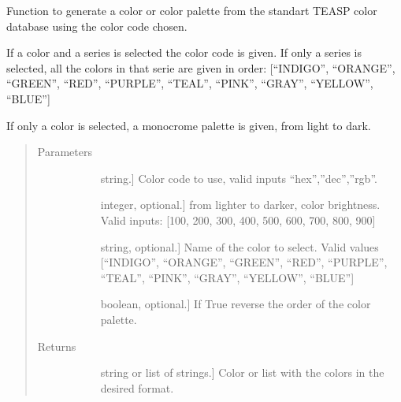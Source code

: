 \documentclass[letterpaper,10pt,english]{sphinxmanual}
\begin{document}
\begin{fulllineitems}
\label{\detokenize{rstFiles/standartColorPalette:standartColorPalette.stdColor}}
Function to generate a color or color palette 
from the standart TEASP color database 
using the color code chosen.

If a color and a series is selected the color code is given. 
If only a series is selected, 
all the colors in that serie are given in order: 
{[}“INDIGO”, “ORANGE”, “GREEN”, “RED”, “PURPLE”, “TEAL”, “PINK”,
“GRAY”, “YELLOW”, “BLUE”{]}

If only a color is selected, a monocrome palette is given, 
from light to dark.
\begin{quote}\begin{description}
\item[{Parameters}] \leavevmode\begin{description}
\item[{}] \leavevmode{[}string.{]}
Color code to use, valid inputs “hex”,”dec”,”rgb”.

\item[{}] \leavevmode{[}integer, optional.{]}
from lighter to darker, color brightness. 
Valid inputs: {[}100, 200, 300, 400, 500, 600, 700, 800, 900{]}

\item[{}] \leavevmode{[}string, optional.{]}
Name of the color to select. 
Valid values {[}“INDIGO”, “ORANGE”, “GREEN”, “RED”, 
“PURPLE”, “TEAL”, “PINK”, “GRAY”, “YELLOW”, “BLUE”{]}

\item[{}] \leavevmode{[}boolean, optional.{]}
If True reverse the order of the color palette.

\end{description}

\item[{Returns}] \leavevmode\begin{description}
\item[{}] \leavevmode{[}string or list of strings.{]}
Color or list with the colors in the desired format.


\end{description}
\end{description}
\end{quote}
\end{fulllineitems}
\end{document}
